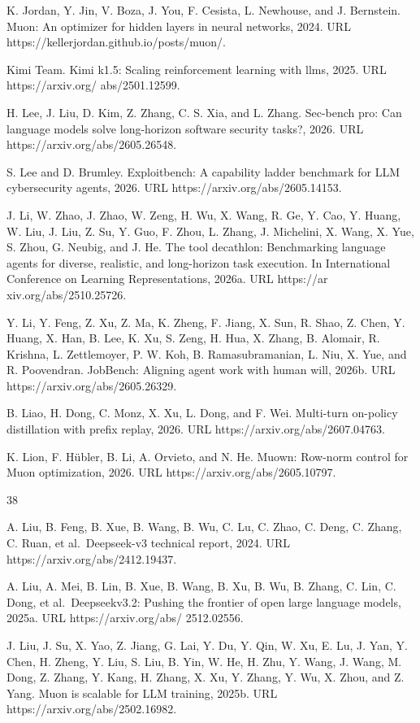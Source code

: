 \documentclass[
  10
]{article}
\begin{document}
K. Jordan, Y. Jin, V. Boza, J. You, F. Cesista, L. Newhouse, and J.
Bernstein. Muon: An optimizer for hidden layers in neural networks,
2024. URL https://kellerjordan.github.io/posts/muon/.

Kimi Team. Kimi k1.5: Scaling reinforcement learning with llms, 2025.
URL https://arxiv.org/ abs/2501.12599.

H. Lee, J. Liu, D. Kim, Z. Zhang, C. S. Xia, and L. Zhang. Sec-bench
pro: Can language models solve long-horizon software security tasks?,
2026. URL https://arxiv.org/abs/2605.26548.

S. Lee and D. Brumley. Exploitbench: A capability ladder benchmark for
LLM cybersecurity agents, 2026. URL https://arxiv.org/abs/2605.14153.

J. Li, W. Zhao, J. Zhao, W. Zeng, H. Wu, X. Wang, R. Ge, Y. Cao, Y.
Huang, W. Liu, J. Liu, Z. Su, Y. Guo, F. Zhou, L. Zhang, J. Michelini,
X. Wang, X. Yue, S. Zhou, G. Neubig, and J. He. The tool decathlon:
Benchmarking language agents for diverse, realistic, and long-horizon
task execution. In International Conference on Learning Representations,
2026a. URL https://ar xiv.org/abs/2510.25726.

Y. Li, Y. Feng, Z. Xu, Z. Ma, K. Zheng, F. Jiang, X. Sun, R. Shao, Z.
Chen, Y. Huang, X. Han, B. Lee, K. Xu, S. Zeng, H. Hua, X. Zhang, B.
Alomair, R. Krishna, L. Zettlemoyer, P. W. Koh, B. Ramasubramanian, L.
Niu, X. Yue, and R. Poovendran. JobBench: Aligning agent work with human
will, 2026b. URL https://arxiv.org/abs/2605.26329.

B. Liao, H. Dong, C. Monz, X. Xu, L. Dong, and F. Wei. Multi-turn
on-policy distillation with prefix replay, 2026. URL
https://arxiv.org/abs/2607.04763.

K. Lion, F. Hübler, B. Li, A. Orvieto, and N. He. Muown: Row-norm
control for Muon optimization, 2026. URL
https://arxiv.org/abs/2605.10797.

38

A. Liu, B. Feng, B. Xue, B. Wang, B. Wu, C. Lu, C. Zhao, C. Deng, C.
Zhang, C. Ruan, et al.~Deepseek-v3 technical report, 2024. URL
https://arxiv.org/abs/2412.19437.

A. Liu, A. Mei, B. Lin, B. Xue, B. Wang, B. Xu, B. Wu, B. Zhang, C. Lin,
C. Dong, et al.~Deepseekv3.2: Pushing the frontier of open large
language models, 2025a. URL https://arxiv.org/abs/ 2512.02556.

J. Liu, J. Su, X. Yao, Z. Jiang, G. Lai, Y. Du, Y. Qin, W. Xu, E. Lu, J.
Yan, Y. Chen, H. Zheng, Y. Liu, S. Liu, B. Yin, W. He, H. Zhu, Y. Wang,
J. Wang, M. Dong, Z. Zhang, Y. Kang, H. Zhang, X. Xu, Y. Zhang, Y. Wu,
X. Zhou, and Z. Yang. Muon is scalable for LLM training, 2025b. URL
https://arxiv.org/abs/2502.16982.
\end{document}
